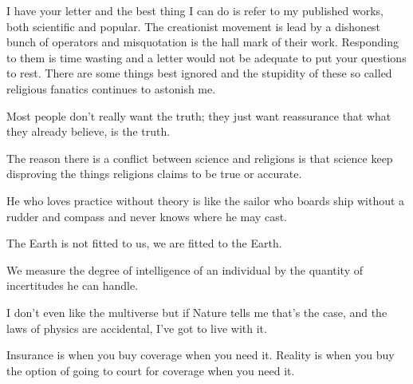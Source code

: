  	\begin{fuquote}I have your letter and the best thing I can do is refer to my published works, both scientific and popular. The creationist movement is lead by a dishonest bunch of operators and misquotation is the hall mark of their work. Responding to them is time wasting and a letter would not be adequate to put your questions to rest. There are some things best ignored and the stupidity of these so called religious fanatics continues to astonish me.
 	\end{fuquote}
 	
 	\begin{fuquote}Most people don't really want the truth; they just want reassurance that what they already believe, is the truth.
 	\end{fuquote}
 	
 	\begin{fuquote}[?]The reason there is a conflict between science and religions is that science keep disproving the things religions claims to be true or accurate.
 	\end{fuquote}
 	
	\begin{fuquote}He who loves practice without theory is like the sailor who boards ship without a rudder and compass and never knows where he may cast.
 	\end{fuquote}
 	
 	\begin{fuquote}[?]The Earth is not fitted to us, we are fitted to the Earth.
 	\end{fuquote}
 	
 	\begin{fuquote}We measure the degree of intelligence of an individual by the quantity of incertitudes he can handle.
 	\end{fuquote}
 	
 	\begin{fuquote}I don't even like the multiverse but if Nature tells me that's the case, and the laws of physics are accidental, I've got to live with it.
 	\end{fuquote}
 	
 	\begin{fuquote}[?]Insurance is when you buy coverage when you need it. Reality is when you buy the option of going to court for coverage when you need it.
 	\end{fuquote}
 	
